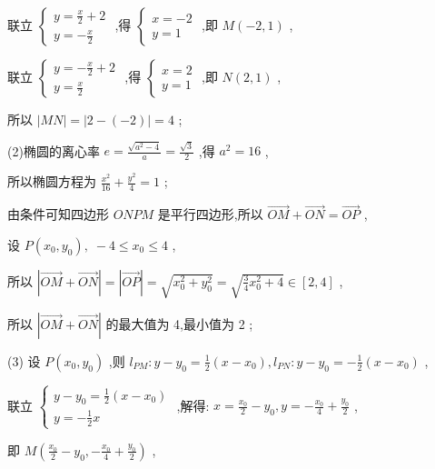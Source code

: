 \documentclass[10pt]{article}
\begin{document}
联立 \(\left\{  \begin{array}{l} y = \frac{x}{2} + 2 \\  y =  - \frac{x}{2} \end{array}\right.\) ,得 \(\left\{  \begin{array}{l} x =  - 2 \\  y = 1 \end{array}\right.\) ,即 \(M\left( {-2,1}\right)\) ,

联立 \(\left\{  \begin{array}{l} y =  - \frac{x}{2} + 2 \\  y = \frac{x}{2} \end{array}\right.\) ,得 \(\left\{  \begin{array}{l} x = 2 \\  y = 1 \end{array}\right.\) ,即 \(N\left( {2,1}\right)\) ,

所以 \(\left| {MN}\right|  = \left| {2 - \left( {-2}\right) }\right|  = 4\) ;

(2)椭圆的离心率 \(e = \frac{\sqrt{{a}^{2} - 4}}{a} = \frac{\sqrt{3}}{2}\) ,得 \({a}^{2} = {16}\) ,

所以椭圆方程为 \(\frac{{x}^{2}}{16} + \frac{{y}^{2}}{4} = 1\) ;

由条件可知四边形 \({ONPM}\) 是平行四边形,所以 \(\overrightarrow{OM} + \overrightarrow{ON} = \overrightarrow{OP}\) ,

设 \(P\left( {{x}_{0},{y}_{0}}\right) ,\; - 4 \leq  {x}_{0} \leq  4\) ,

所以 \(\left| {\overrightarrow{OM} + \overrightarrow{ON}}\right|  = \left| \overrightarrow{OP}\right|  = \sqrt{{x}_{0}^{2} + {y}_{0}^{2}} = \sqrt{\frac{3}{4}{x}_{0}^{2} + 4} \in  \left\lbrack  {2,4}\right\rbrack\) ,

所以 \(\left| {\overrightarrow{OM} + \overrightarrow{ON}}\right|\) 的最大值为 4,最小值为 2 ;

(3) 设 \(P\left( {{x}_{0},{y}_{0}}\right)\) ,则 \({l}_{PM} : y - {y}_{0} = \frac{1}{2}\left( {x - {x}_{0}}\right) ,{l}_{PN} : y - {y}_{0} =  - \frac{1}{2}\left( {x - {x}_{0}}\right)\) ,

联立 \(\left\{  \begin{array}{l} y - {y}_{0} = \frac{1}{2}\left( {x - {x}_{0}}\right) \\  y =  - \frac{1}{2}x \end{array}\right.\) ,解得: \(x = \frac{{x}_{0}}{2} - {y}_{0},y =  - \frac{{x}_{0}}{4} + \frac{{y}_{0}}{2}\) ,

即 \(M\left( {\frac{{x}_{0}}{2} - {y}_{0}, - \frac{{x}_{0}}{4} + \frac{{y}_{0}}{2}}\right)\) ,
\end{document}
